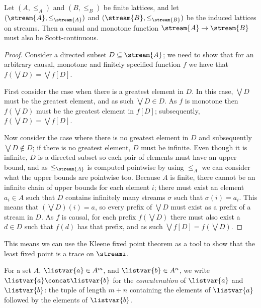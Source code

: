 \documentclass{lmcs}
\begin{document}
\begin{prop}\label{prop:monotone-causal-scott}
    Let \((A, \leq_A)\) and \((B, \leq_B)\) be finite lattices, and let
    \((\stream{A}, \leq_{\stream{A}})\) and \((\stream{B}, \leq_{\stream{B}})\)
    be the induced lattices on streams.
    Then a causal and monotone function \(\stream{A} \to \stream{B}\) must also
    be Scott-continuous.
\end{prop}
\begin{proof}
    Consider a directed subset \(D \subseteq \stream{A}\); we need to show that
    for an arbitrary causal, monotone and finitely specified function \(f\) we
    have that \(f\left(\bigvee D\right) = \bigvee f[D]\).

    First consider the case when there is a greatest element in \(D\).
    In this case, \(\bigvee D\) must be the greatest element, and as such
    \(\bigvee D \in D\).
    As \(f\) is monotone then \(f(\bigvee D)\) must be the greatest element in
    \(f[D]\); subsequently, \(f\left(\bigvee D\right) = \bigvee f[D]\).

    Now consider the case where there is no greatest element in \(D\) and
    subsequently \(\bigvee D \not\in D\); if there is no greatest element,
    \(D\) must be infinite.
    Even though it is infinite, \(D\) is a directed subset so each pair of
    elements must have an upper bound, and as \(\leq_{\stream{A}}\) is computed
    pointwise by using \(\leq_A\) we can consider what the upper bounds are
    pointwise too.
    Because \(A\) is finite, there cannot be an infinite chain of upper bounds
    for each element \(i\); there must exist an element \(a_i \in A\) such that
    \(D\) contains infinitely many streams \(\sigma\) such that
    \(\sigma(i) = a_i\).
    This means that \(\left(\bigvee D\right)(i) = a\), so every prefix of
    \(\bigvee D\) must exist as a prefix of a stream in \(D\).
    As \(f\) is causal, for each prefix
    \(f\left(\bigvee D\right)\) there must also exist a \(d \in D\) such that
    \(f(d)\) has that prefix, and as such
    \(\bigvee f[D] = f\left(\bigvee D\right)\).
\end{proof}

This means we can use the Kleene fixed point theorem as a tool to show that the
least fixed point is a trace on \(\streami\).

\begin{nota}[Concatenation]
    For a set \(A\), \(\listvar{a} \in A^m\), and \(\listvar{b} \in A^n\), we
    write \(\listvar{a} \concat \listvar{b}\) for the \emph{concatenation}
    of \(\listvar{a}\) and \(\listvar{b}\): the tuple of length \(m+n\)
    containing the elements of \(\listvar{a}\) followed by the elements of
    \(\listvar{b}\).
\end{nota}
\end{document}

